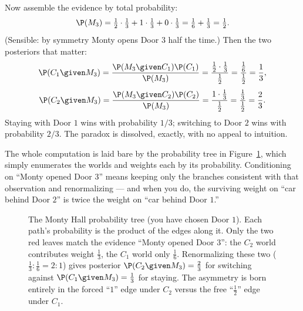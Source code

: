 Now assemble the evidence by total probability:
\[
  \P(M_3) = \tfrac12\cdot\tfrac13 + 1\cdot\tfrac13 + 0\cdot\tfrac13
          = \tfrac16 + \tfrac13 = \tfrac12.
\]
(Sensible: by symmetry Monty opens Door $3$ half the time.) Then the two posteriors that
matter:
\[
  \P(C_1 \given M_3) = \frac{\P(M_3\given C_1)\P(C_1)}{\P(M_3)}
  = \frac{\tfrac12\cdot\tfrac13}{\tfrac12} = \frac{\tfrac16}{\tfrac12} = \frac13,
\]
\[
  \P(C_2 \given M_3) = \frac{\P(M_3\given C_2)\P(C_2)}{\P(M_3)}
  = \frac{1\cdot\tfrac13}{\tfrac12} = \frac{\tfrac13}{\tfrac12} = \frac23.
\]
Staying with Door $1$ wins with probability $1/3$; switching to Door $2$ wins with
probability $2/3$. The paradox is dissolved, exactly, with no appeal to intuition.

The whole computation is laid bare by the probability tree in Figure~\ref{ch05:fig-monty},
which simply enumerates the worlds and weights each by its probability. Conditioning on
``Monty opened Door $3$'' means keeping only the branches consistent with that observation
and renormalizing --- and when you do, the surviving weight on ``car behind Door $2$'' is
twice the weight on ``car behind Door $1$.''

\begin{figure}[H]
\centering
{}
\caption{The Monty Hall probability tree (you have chosen Door $1$). Each path's probability
is the product of the edges along it. Only the two red leaves match the evidence ``Monty
opened Door $3$'': the $C_2$ world contributes weight $\tfrac13$, the $C_1$ world only
$\tfrac16$. Renormalizing these two ($\tfrac13 : \tfrac16 = 2 : 1$) gives posterior
$\P(C_2\given M_3)=\tfrac23$ for switching against $\P(C_1\given M_3)=\tfrac13$ for staying.
The asymmetry is born entirely in the forced ``$1$'' edge under $C_2$ versus the free
``$\tfrac12$'' edge under $C_1$.}
\label{ch05:fig-monty}
\end{figure}

